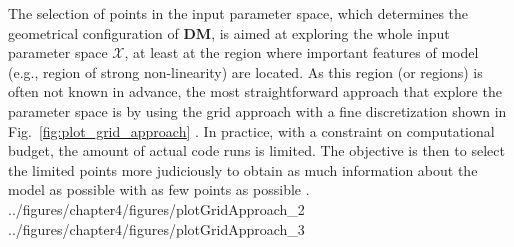 The selection of points in the input parameter space, which determines the geometrical configuration of $\mathbf{DM}$, is aimed at exploring the whole input parameter space $\mathcal{X}$, at least at the region where important features of model (e.g., region of strong non-linearity) are located.
As this region (or regions) is often not known in advance, 
the most straightforward approach that explore the parameter space is by using the grid approach with a fine discretization shown in Fig.~\ref{fig:plot_grid_approach} \cite{Koehler1996}.
In practice, with a constraint on computational budget, the amount of actual code runs is limited.
The objective is then to select the limited points more judiciously to obtain as much information about the model as possible with as few points as possible \cite{Simpson2001a,Fang2006}.  
{../figures/chapter4/figures/plotGridApproach_2}
{../figures/chapter4/figures/plotGridApproach_3}

